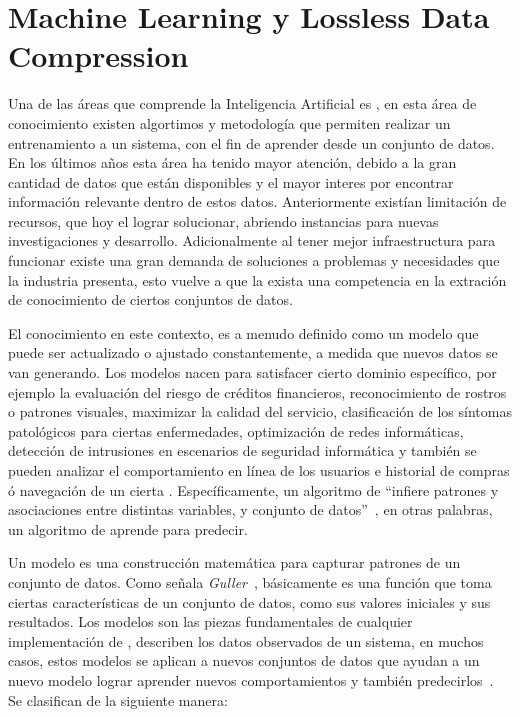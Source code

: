
\chapter[Machine Learning y Lossless Data Compression]{Machine Learning y Lossless Data Compression}\label{ch:Compresion-Machine-Learning}


Una de las áreas que comprende la Inteligencia Artificial es \machinelearning, en esta área de conocimiento existen algortimos y metodología que permiten realizar un entrenamiento a un sistema, con el fin de aprender desde un conjunto de datos. En los últimos años esta área ha tenido mayor atención, debido a la gran cantidad de datos que están disponibles y el mayor interes por encontrar información relevante dentro de estos datos. Anteriormente existían limitación de recursos, que hoy el \cloudcomputing lograr solucionar, abriendo instancias para nuevas investigaciones y desarrollo. Adicionalmente al tener mejor infraestructura para funcionar existe una gran demanda de soluciones a problemas y necesidades que la industria presenta, esto vuelve a que la exista una competencia en la extración de conocimiento de ciertos conjuntos de datos.

El conocimiento en este contexto, es a menudo definido como un modelo que puede ser actualizado o ajustado constantemente, a medida que nuevos datos se van generando. Los modelos nacen para satisfacer cierto dominio específico, por ejemplo la evaluación del riesgo de créditos financieros, reconocimiento de rostros o patrones visuales, maximizar la calidad del servicio, clasificación de los síntomas patológicos para ciertas enfermedades, optimización de redes informáticas, detección de intrusiones en escenarios de seguridad informática y también se pueden analizar el comportamiento en línea de los usuarios e historial de compras ó navegación  de un cierta \web. Específicamente, un algoritmo de \machinelearning ``infiere patrones y asociaciones entre distintas variables, y conjunto de datos''~\cite[capítulo 8]{guller2015big}, en otras palabras, un algoritmo de \machinelearning aprende para predecir. 


Un modelo es una construcción matemática para capturar patrones de un conjunto de datos. Como señala \emph{Guller}~\MLGuller, básicamente es una función que toma ciertas características de un conjunto de datos, como sus valores iniciales y sus resultados.  Los modelos son las piezas fundamentales de cualquier implementación de \machinelearning, describen los datos observados de un sistema, en muchos casos, estos modelos se aplican a nuevos conjuntos de datos que ayudan a un nuevo modelo lograr aprender nuevos comportamientos y también predecirlos~\MLPDASunila. Se clasifican de la siguiente manera:

